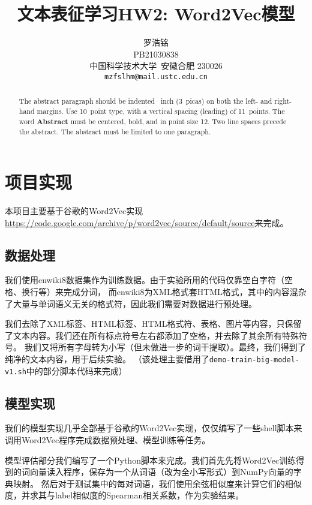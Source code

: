 \documentclass{article}
\title{文本表征学习HW2: Word2Vec模型}
\author{
  罗浩铭 \\
  PB21030838\\
  中国科学技术大学\ 安徽合肥 230026 \\
  \texttt{mzfslhm@mail.ustc.edu.cn} \\
}
\begin{document}
\maketitle


\begin{abstract}
  The abstract paragraph should be indented ~inch (3~picas) on
  both the left- and right-hand margins. Use 10~point type, with a vertical
  spacing (leading) of 11~points.  The word \textbf{Abstract} must be centered,
  bold, and in point size 12. Two line spaces precede the abstract. The abstract
  must be limited to one paragraph.
\end{abstract}

\section{项目实现}

本项目主要基于谷歌的Word2Vec实现\url{https://code.google.com/archive/p/word2vec/source/default/source}来完成。

\subsection{数据处理}

我们使用enwiki8数据集作为训练数据。由于实验所用的代码仅靠空白字符（空格、换行等）来完成分词，
而enwiki8为XML格式套HTML格式，其中的内容混杂了大量与单词语义无关的格式符，因此我们需要对数据进行预处理。

我们去除了XML标签、HTML标签、HTML格式符、表格、图片等内容，只保留了文本内容。我们还在所有标点符号左右都添加了空格，并去除了其余所有特殊符号。
我们又将所有字母转为小写（但未做进一步的词干提取）。最终，我们得到了纯净的文本内容，用于后续实验。
（该处理主要借用了\texttt{demo-train-big-model-v1.sh}中的部分脚本代码来完成）


\subsection{模型实现}
我们的模型实现几乎全部基于谷歌的Word2Vec实现，仅仅编写了一些shell脚本来调用Word2Vec程序完成数据预处理、模型训练等任务。

模型评估部分我们编写了一个Python脚本来完成。我们首先先将Word2Vec训练得到的词向量读入程序，保存为一个从词语（改为全小写形式）到NumPy向量的字典映射。
然后对于测试集中的每对词语，我们使用余弦相似度来计算它们的相似度，并求其与label相似度的Spearman相关系数，作为实验结果。
\end{document}
